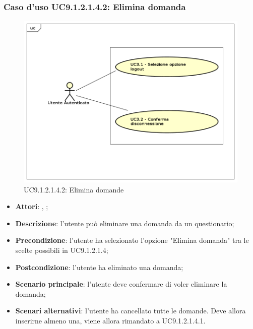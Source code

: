 						\subsubsection{Caso d'uso UC9.1.2.1.4.2: Elimina domanda}
						\label{UC9.1.2.1.4.2}
						\begin{figure}[h]
							\centering
						\includegraphics[scale=0.5,keepaspectratio]{UML/UC9.png}
							\caption{UC9.1.2.1.4.2: Elimina domande}
						\end{figure}
						\FloatBarrier
						\begin{itemize}
							\item \textbf{Attori}: \uau, \uaupro;
							\item \textbf{Descrizione}: l'utente può eliminare una domanda da un questionario;
							\item \textbf{Precondizione}: l'utente ha selezionato l'opzione "Elimina domanda" tra le scelte possibili in UC9.1.2.1.4;
							\item \textbf{Postcondizione}: l'utente ha eliminato una domanda;
							\item \textbf{Scenario principale}: l'utente deve confermare di voler eliminare la domanda; 
							\item \textbf{Scenari alternativi}: l'utente ha cancellato tutte le domande. Deve allora inserirne almeno una, viene allora rimandato a UC9.1.2.1.4.1.
						\end{itemize}
						
